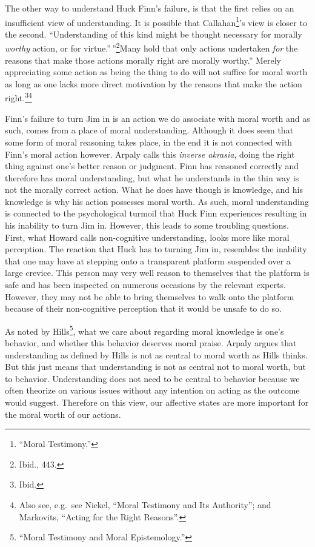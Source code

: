 \documentclass[phdthesis,12pt,final,a4paper]{wuthesis}
\theoremstyle{definition}
\theoremstyle{definition}
\theoremstyle{definition}
\theoremstyle{definition}
\theoremstyle{remark}
\begin{document}
The other way to understand Huck Finn's failure, is that the first relies on an insufficient view of understanding. It is possible that Callahan\footnote{{``Moral {Testimony}.''}}'s view is closer to the second. ``Understanding of this kind might be thought necessary for morally \emph{worthy} action, or for virtue.''\,''\footnote{Ibid., 443.}Many hold that only actions undertaken \emph{for} the reasons that make those actions morally right are morally worthy.'' Merely appreciating some action as being the thing to do will not suffice for moral worth as long as one lacks more direct motivation by the reasons that make the action right.\footnote{Ibid.}\footnote{Also see, e.g.~see Nickel, {``Moral {Testimony} and Its {Authority}''}; and Markovits, {``Acting for the {Right Reasons}''}.}

Finn's failure to turn Jim in is an action we do associate with moral worth and as such, comes from a place of moral understanding. Although it does seem that some form of moral reasoning takes place, in the end it is not connected with Finn's moral action however. Arpaly calls this \emph{inverse akrasia}, doing the right thing against one's better reason or judgment. Finn has reasoned correctly and therefore has moral understanding, but what he understands in the thin way is not the morally correct action. What he does have though is knowledge, and his knowledge is why his action possesses moral worth. As such, moral understanding is connected to the psychological turmoil that Huck Finn experiences resulting in his inability to turn Jim in. However, this leads to some troubling questions. First, what Howard calls non-cognitive understanding, looks more like moral perception. The reaction that Huck has to turning Jim in, resembles the inability that one may have at stepping onto a transparent platform suspended over a large crevice. This person may very well reason to themselves that the platform is safe and has been inspected on numerous occasions by the relevant experts. However, they may not be able to bring themselves to walk onto the platform because of their non-cognitive perception that it would be unsafe to do so.

As noted by Hills\footnote{{``Moral Testimony and Moral Epistemology.''}}, what we care about regarding moral knowledge is one's behavior, and whether this behavior deserves moral praise. Arpaly argues that understanding as defined by Hills is not as central to moral worth as Hills thinks. But this just means that understanding is not as central not to moral worth, but to behavior. Understanding does not need to be central to behavior because we often theorize on various issues without any intention on acting as the outcome would suggest. Therefore on this view, our affective states are more important for the moral worth of our actions.
\end{document}
